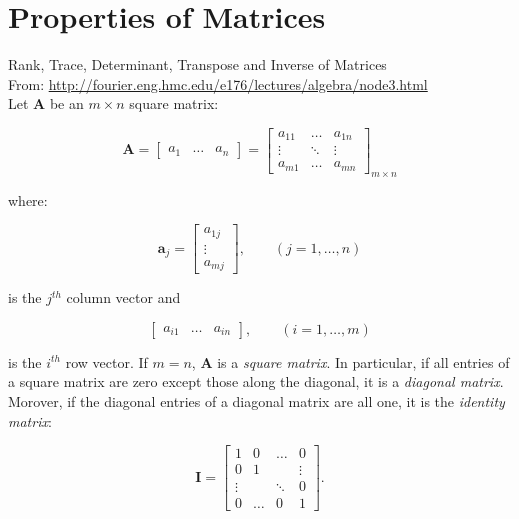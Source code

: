 \documentclass[10pt,b5paper,titlepage]{book}
\begin{document}
\chapter{Properties of Matrices}
Rank, Trace, Determinant, Transpose and Inverse of Matrices\\

From: \url{http://fourier.eng.hmc.edu/e176/lectures/algebra/node3.html}\\

Let $\mathbf{A}$ be an $m \times n$ square matrix:

\begin{equation}
    \mathbf{A} = \begin{bmatrix} a_1 & \ldots & a_n \end{bmatrix}
    = \begin{bmatrix}
        a_{11} & \ldots & a_{1n}\\
        \vdots & \ddots & \vdots\\
        a_{m1} & \ldots & a_{mn}
    \end{bmatrix}_{m \times n}
\end{equation}

where:

\begin{equation}
    \mathbf{a}_{j} = \begin{bmatrix} a_{1j}\\ \vdots\\ a_{mj} \end{bmatrix}
    ,\qquad (j = 1, \ldots, n)
\end{equation}

is the $j^{th}$ column vector and

\begin{equation}
    \begin{bmatrix} a_{i1} & \ldots & a_{in} \end{bmatrix}
    , \qquad (i = 1, \ldots, m)
\end{equation}

is the $i^{th}$ row vector. If $m = n$, $\mathbf{A}$ is a \textit{square matrix}.
In particular, if all entries of a square matrix are zero except those along the
diagonal, it is a \textit{diagonal matrix}. Morover, if the diagonal entries of
a diagonal matrix are all one, it is the \textit{identity matrix}:

\begin{equation}
    \mathbf{I} = \begin{bmatrix}
        1 & 0 & \ldots & 0\\
        0 & 1 &   & \vdots\\
        \vdots & & \ddots & 0\\
        0 & \ldots & 0 & 1
    \end{bmatrix}
.\end{equation}
\end{document}
